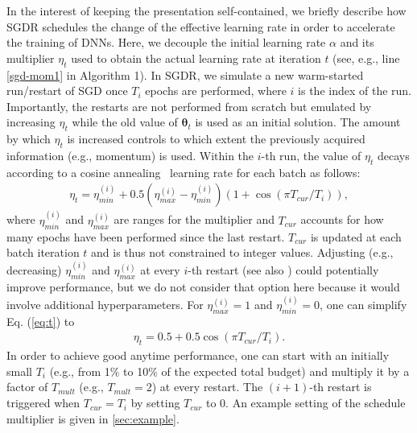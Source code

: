 \documentclass[usenames,dvipsnames]{article} %
\newcommand{\note}[1]{
	\noindent~\\
	\vspace{0.25cm}
	\fcolorbox{red}{yellow}{\parbox{0.97\textwidth}{#1\\}}
	\vspace{0.25cm}
}
\begin{document}
In the interest of keeping the presentation self-contained, we briefly describe how SGDR schedules the change of the effective learning rate in order to accelerate the training of DNNs. Here, we decouple the initial learning rate $\alpha$ and its multiplier $\eta_t$ used to obtain the actual learning rate at iteration $t$ (see, e.g., line \ref{sgd-mom1} in Algorithm 1). 
In SGDR, we simulate a new warm-started run/restart of SGD once $T_i$ epochs are performed, where $i$ is the index of the run. Importantly, the restarts are not performed from scratch but emulated by increasing $\eta_t$ while the old value of $\bm{\theta}_{t}$ is used as an initial solution. The amount by which $\eta_t$ is increased controls to which extent the previously acquired information (e.g., momentum) is used. Within the $i$-th run, the value of $\eta_t$ decays according to a cosine annealing~\citep{loshchilov2016sgdr} 
learning rate for each batch as follows:
%
\begin{eqnarray}
	\label{eq:t}
	\eta_t = \eta^{(i)}_{min} + 0.5 (\eta^{(i)}_{max} - \eta^{(i)}_{min}) (1 + \cos(\pi T_{cur} / {T_i})),	
\end{eqnarray}
%
where $\eta^{(i)}_{min}$ and $\eta^{(i)}_{max}$ are ranges for the multiplier and $T_{cur}$ accounts for how many epochs have been performed since the last restart.  $T_{cur}$ is updated at each batch iteration $t$ and is thus not constrained to integer values.
Adjusting (e.g., decreasing) $\eta^{(i)}_{min}$ and $\eta^{(i)}_{max}$ at every $i$-th restart (see also \cite{smith2016}) could potentially improve performance, but we do not consider that option here because it would involve additional hyperparameters. 
For $\eta^{(i)}_{max}=1$ and $\eta^{(i)}_{min}=0$, one can simplify Eq. (\ref{eq:t}) to
\begin{eqnarray}
	\label{eq:t2}
	\eta_t = 0.5 + 0.5\cos(\pi T_{cur} / {T_i}).	
\end{eqnarray}
%
In order to achieve good anytime performance, one can start with an initially small $T_i$ (e.g., from 1\% to 10\% of the expected total budget) and multiply it by a factor of $T_{mult}$ (e.g., $T_{mult}=2$) at every restart. The $(i+1)$-th restart is triggered when $T_{cur} = T_i$ by setting $T_{cur}$ to 0. An example setting of the schedule multiplier is given in  \ref{sec:example}. 
\end{document}
